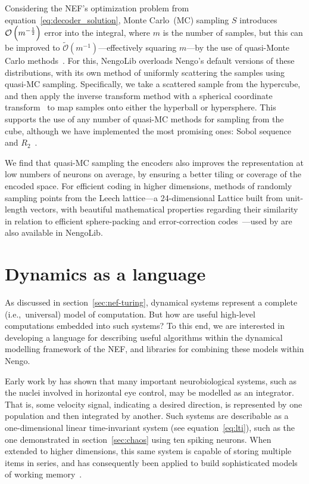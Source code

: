 Considering the NEF's optimization problem from equation~\ref{eq:decoder_solution},
Monte Carlo~(MC) sampling $S$ introduces $\mathcal{O}\left({ m^{-\frac{1}{2}} }\right)$ error into the integral, where $m$ is the number of samples, but this can be improved to $\widetilde{\mathcal{O}} \left( m^{-1} \right)$---effectively squaring $m$---by the use of quasi-Monte Carlo methods~\citep{fang1994, knight2016}.
For this, NengoLib overloads Nengo's default versions of these distributions, with its own method of uniformly scattering the samples using quasi-MC sampling.
Specifically, we take a scattered sample from the hypercube, and then apply the inverse transform method with a spherical coordinate transform~\citep{fang1994} to map samples onto either the hyperball or hypersphere.
This supports the use of any number of quasi-MC methods for sampling from the cube, although we have implemented the most promising ones: Sobol sequence and $R_2$~\citep{Sobol1967, quasimc}.

We find that quasi-MC sampling the encoders also improves the representation at low numbers of neurons on average, by ensuring a better tiling or coverage of the encoded space.
For efficient coding in higher dimensions, methods of randomly sampling points from the Leech lattice---a 24-dimensional Lattice built from  unit-length vectors, with beautiful mathematical properties regarding their similarity in relation to efficient sphere-packing and error-correction codes~\citep{Conway1999}---used by \citet{knight2016} are also available in NengoLib.


\section{Dynamics as a language}
\label{sec:dynamics-language}

As discussed in section~\ref{sec:nef-turing}, dynamical systems represent a complete (i.e.,~universal) model of computation.
But how are useful high-level computations embedded into such systems?
To this end, we are interested in developing a language for describing useful algorithms within the dynamical modelling framework of the NEF, and libraries for combining these models within Nengo.

Early work by \citet{eliasmith2003a} has shown that many important neurobiological systems, such as the nuclei involved in horizontal eye control, may be modelled as an integrator.
That is, some velocity signal, indicating a desired direction, is represented by one population and then integrated by another.
Such systems are describable as a one-dimensional linear time-invariant system (see equation~\ref{eq:lti}), such as the one demonstrated in section~\ref{sec:chaos} using ten spiking neurons. 
When extended to higher dimensions, this same system is capable of storing multiple items in series, and has consequently been applied to build sophisticated models of working memory~\citep{singh2004, choo2010}.

